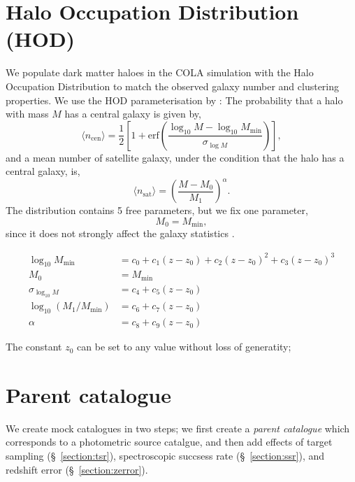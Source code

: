 \documentclass[a4paper,11pt]{article}
\begin{document}
\section{Halo Occupation Distribution (HOD)}
\label{section:hod}

We populate dark matter haloes in the COLA simulation with the Halo
Occupation Distribution to match the observed galaxy number and
clustering properties. We use the HOD parameterisation by
\citet{2005ApJ...633..791Z}: The probability that a halo with mass $M$ has
a central galaxy is given by,
%
\begin{equation}
  \langle n_\mathrm{cen} \rangle = \frac{1}{2}
  \left[ 1 + \mathrm{erf}\left( \frac{\log_{10} M - \log_{10} M_\mathrm{min}}{\sigma_{\log M}} \right) \right],
\end{equation}
%
and a mean number of satellite galaxy, under the condition that the halo has a central galaxy, is,
%
\begin{equation}
  \langle n_\mathrm{sat} \rangle = \left( \frac{M - M_0}{M_1} \right)^\alpha.
\end{equation}
%
The distribution contains 5 free parameters, but we fix one parameter,
\begin{equation}
  M_0 = M_\mathrm{min},
\end{equation}
since it does not strongly affect the galaxy statistics
\citep[e.g.][]{2013A&A...557A..54D}.


\begin{align}
  \log_{10} M_\mathrm{min}  &= c_0 + c_1 (z - z_0) + c_2 (z - z_0)^2 + c_3 (z - z_0)^3\\
  M_0                     &= M_\mathrm{min}\\
  \sigma_{\log_{10} M}      &= c_4 + c_5 (z - z_0)\\
  \log_{10} (M_1/M_\mathrm{min}) &= c_6 + c_7 (z - z_0) \\
  \alpha                  &= c_8 + c_9 (z - z_0)
\end{align}

The constant $z_0$ can be set to any value without loss of generatity;

\section{Parent catalogue}

We create mock catalogues in two steps; we first create a
\textit{parent catalogue} which corresponds to a photometric source
catalgue, and then add effects of target sampling
(\S~\ref{section:tsr}), spectroscopic succsess rate
(\S~\ref{section:ssr}), and redshift error (\S~\ref{section:zerror}).
\end{document}
